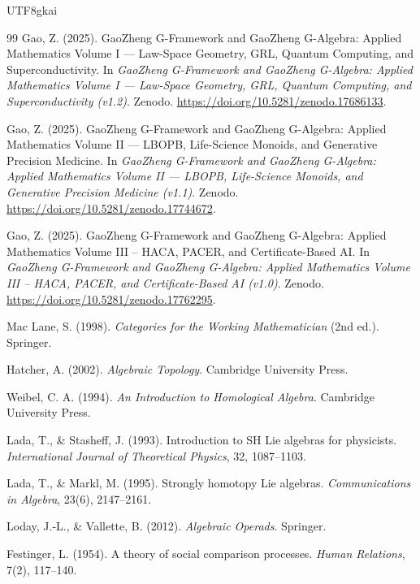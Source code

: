 \documentclass[12pt]{article}
\begin{document}
\begin{CJK*}{UTF8}{gkai}
\begin{thebibliography}{99}
Gao, Z. (2025).
\newblock GaoZheng G-Framework and GaoZheng G-Algebra: Applied Mathematics Volume I — Law-Space Geometry, GRL, Quantum Computing, and Superconductivity.
\newblock In \emph{GaoZheng G-Framework and GaoZheng G-Algebra: Applied Mathematics Volume I — Law-Space Geometry, GRL, Quantum Computing, and Superconductivity (v1.2)}.
\newblock Zenodo.
\newblock \url{https://doi.org/10.5281/zenodo.17686133}.

Gao, Z. (2025).
\newblock GaoZheng G-Framework and GaoZheng G-Algebra: Applied Mathematics Volume II — LBOPB, Life-Science Monoids, and Generative Precision Medicine.
\newblock In \emph{GaoZheng G-Framework and GaoZheng G-Algebra: Applied Mathematics Volume II — LBOPB, Life-Science Monoids, and Generative Precision Medicine (v1.1)}.
\newblock Zenodo.
\newblock \url{https://doi.org/10.5281/zenodo.17744672}.

Gao, Z. (2025).
\newblock GaoZheng G-Framework and GaoZheng G-Algebra: Applied Mathematics Volume III -- HACA, PACER, and Certificate-Based AI.
\newblock In \emph{GaoZheng G-Framework and GaoZheng G-Algebra: Applied Mathematics Volume III -- HACA, PACER, and Certificate-Based AI (v1.0)}.
\newblock Zenodo.
\newblock \url{https://doi.org/10.5281/zenodo.17762295}.

Mac Lane, S. (1998).
\newblock \emph{Categories for the Working Mathematician} (2nd ed.).
\newblock Springer.

Hatcher, A. (2002).
\newblock \emph{Algebraic Topology}.
\newblock Cambridge University Press.

Weibel, C. A. (1994).
\newblock \emph{An Introduction to Homological Algebra}.
\newblock Cambridge University Press.

Lada, T., \& Stasheff, J. (1993).
\newblock Introduction to SH Lie algebras for physicists.
\newblock \emph{International Journal of Theoretical Physics}, 32, 1087--1103.

Lada, T., \& Markl, M. (1995).
\newblock Strongly homotopy Lie algebras.
\newblock \emph{Communications in Algebra}, 23(6), 2147--2161.

Loday, J.-L., \& Vallette, B. (2012).
\newblock \emph{Algebraic Operads}.
\newblock Springer.

Festinger, L. (1954).
\newblock A theory of social comparison processes.
\newblock \emph{Human Relations}, 7(2), 117--140.


\end{thebibliography}
\end{CJK*}
\end{document}
